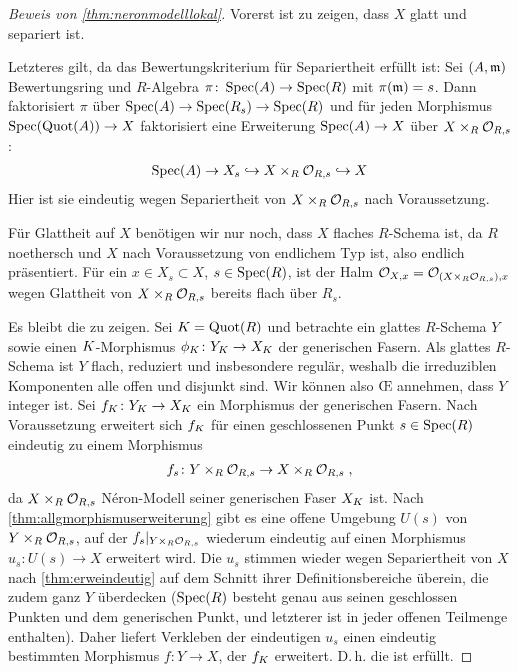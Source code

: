 \documentclass[german]{scrreprt}
\begin{document}
\begin{proof}[Beweis von \ref{thm:neronmodelllokal}]
  Vorerst ist zu zeigen, dass $X$ glatt und separiert ist.

  Letzteres gilt, da das Bewertungskriterium für Separiertheit
  erfüllt ist: Sei $(A,\mathfrak{m})$ Bewertungsring und $R$-Algebra
  $\pi\colon\operatorname{Spec}(A)\to\operatorname{Spec}(R)$ mit $\pi(\mathfrak{m})=s$.
  Dann faktorisiert $\pi$ über
  $\operatorname{Spec}(A)\to\operatorname{Spec}(R_s)\to\operatorname{Spec}(R)$ und für jeden Morphismus
  $\operatorname{Spec}(\operatorname{Quot}(A))\to X$ faktorisiert eine Erweiterung
  $\operatorname{Spec}(A)\to X$ über $X\times_R\mathcal{O}_{R,s}$:
  \begin{gather*}
    \operatorname{Spec}(A)\to X_s\hookrightarrow X\times_R\mathcal{O}_{R,s}\hookrightarrow X
  \end{gather*}
  Hier ist sie eindeutig wegen
  Separiertheit von $X\times_R\mathcal{O}_{R,s}$ nach Voraussetzung.

  Für Glattheit auf $X$ benötigen wir nur noch, dass $X$ flaches
  $R$-Schema ist, da $R$ noethersch und $X$ nach Voraussetzung von
  endlichem Typ ist, also endlich präsentiert.
  Für ein $x\in X_s\subset X$, $s\in\operatorname{Spec}(R)$, ist der Halm
  $\mathcal{O}_{X,x}=\mathcal{O}_{(X\times_R\mathcal{O}_{R,s}),x}$ wegen Glattheit von
  $X\times_R\mathcal{O}_{R,s}$ bereits flach über $R_s$.

  Es bleibt die \NAbbEig zu zeigen.
  Sei $K=\operatorname{Quot}(R)$ und betrachte ein glattes $R$-Schema $Y$ sowie
  einen $K$-Morphismus $\phi_{K}\colon Y_{K}\to X_{K}$ der
  generischen Fasern.
  Als glattes $R$-Schema ist $Y$ flach, reduziert und insbesondere
  regulär, weshalb die irreduziblen Komponenten alle offen und
  disjunkt sind. Wir können also \OE{} annehmen, dass $Y$ integer ist.
  Sei $f_{K}\colon Y_{K}\to X_{K}$ ein Morphismus der generischen Fasern.
  Nach Voraussetzung erweitert sich $f_{K}$ für einen geschlossenen
  Punkt $s\in\operatorname{Spec}(R)$ eindeutig zu einem Morphismus
  \begin{gather*}
    f_s\colon Y\times_R\mathcal{O}_{R,s}\to X\times_R\mathcal{O}_{R,s}\;,
  \end{gather*}
  da $X\times_R\mathcal{O}_{R,s}$ Néron-Modell seiner generischen Faser $X_{K}$
  ist.
  Nach \ref{thm:allgmorphismuserweiterung} gibt es eine offene
  Umgebung $U(s)$ von $Y\times_R\mathcal{O}_{R,s}$, auf der
  $f_s|_{Y\times_R\mathcal{O}_{R,s}}$ wiederum
  eindeutig auf einen Morphismus $u_s\colon U(s)\to X$ erweitert
  wird.
  Die $u_s$ stimmen wieder wegen Separiertheit von $X$
  nach \ref{thm:erweindeutig} auf dem Schnitt ihrer
  Definitionsbereiche überein, die zudem ganz $Y$ überdecken
  ($\operatorname{Spec}(R)$ besteht genau aus seinen
  geschlossen Punkten und dem generischen Punkt, und letzterer ist
  in jeder offenen Teilmenge enthalten).
  Daher liefert Verkleben der eindeutigen $u_s$ einen
  eindeutig bestimmten Morphismus $f\colon Y\to X$, der
  $f_{K}$ erweitert.
  D.\,h. die \NAbbEig ist erfüllt.
\end{proof}
\end{document}
